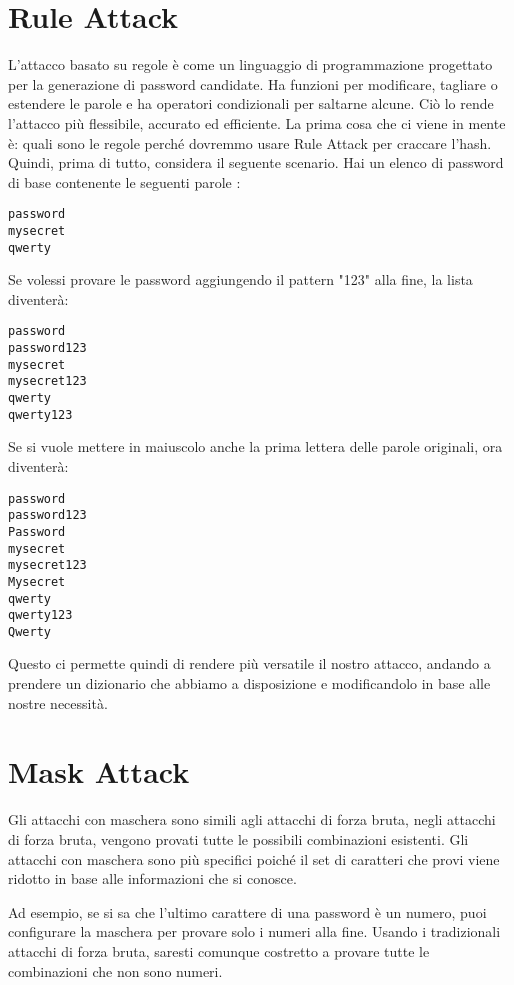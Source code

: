 \section{Rule Attack}
L'attacco basato su regole\cite{Rule_based} è come un linguaggio di programmazione progettato per la generazione di password candidate. Ha funzioni per modificare, tagliare o estendere le parole e ha operatori condizionali per saltarne alcune. Ciò lo rende l'attacco più flessibile, accurato ed efficiente.
La prima cosa che ci viene in mente è: quali sono le regole perché dovremmo usare Rule Attack per craccare l'hash. Quindi, prima di tutto, considera il seguente scenario. Hai un elenco di password di base contenente le seguenti parole :

\begin{lstlisting}[caption={Esempio rule attack wordlist}, style=javaScriptCode]
password
mysecret
qwerty
\end{lstlisting}
Se volessi provare le password aggiungendo il pattern "123" alla fine, la lista diventerà:
\begin{lstlisting}[caption={Esempio rule attack wordlist}, style=javaScriptCode]
password
password123
mysecret
mysecret123
qwerty
qwerty123
\end{lstlisting}
Se si vuole mettere in maiuscolo anche la prima lettera delle parole originali, ora diventerà:
\begin{lstlisting}[caption={Esempio rule attack wordlist}, style=javaScriptCode]
password
password123
Password
mysecret
mysecret123
Mysecret
qwerty
qwerty123
Qwerty
\end{lstlisting}

Questo ci permette quindi di rendere più versatile il nostro attacco, andando a prendere un dizionario che abbiamo a disposizione e modificandolo in base alle nostre necessità.

\section{Mask Attack}
Gli attacchi con maschera \cite{Mask_attack} sono simili agli attacchi di forza bruta, negli attacchi di forza bruta, vengono provati tutte le possibili combinazioni esistenti. Gli attacchi con maschera sono più specifici poiché il set di caratteri che provi viene ridotto in base alle informazioni che si conosce.

Ad esempio, se si sa che l'ultimo carattere di una password è un numero, puoi configurare la maschera per provare solo i numeri alla fine. Usando i tradizionali attacchi di forza bruta, saresti comunque costretto a provare tutte le combinazioni che non sono numeri.

